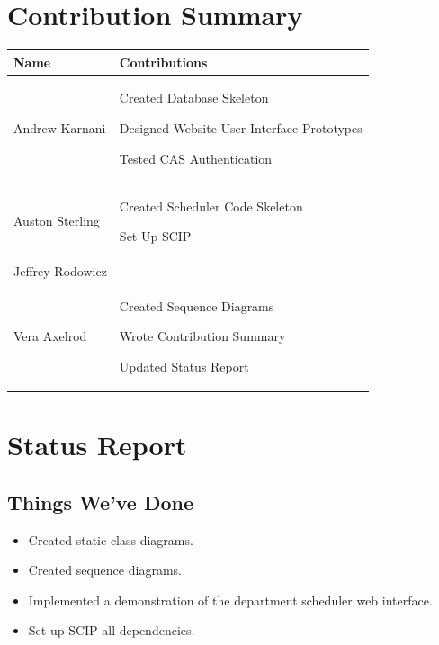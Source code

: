 \documentclass[11pt]{article}
\newenvironment{packed_itemize}{
\begin{itemize}
  \setlength{\itemsep}{1pt}
  \setlength{\parskip}{0pt}
  \setlength{\parsep}{0pt}
}{\end{itemize}}
\begin{document}
\section{Contribution Summary} %
\begin{tabular}{|m{1.4in}|m{4in}|}
\hline 
\textbf{\large Name}     & \textbf{\large Contributions} \\
\hline\hline

 Andrew Karnani
	&
	 \begin{packed_itemize}
		\item Created Database Skeleton
		\item Designed Website User Interface Prototypes
		\item Tested CAS Authentication
	\end{packed_itemize}
\\
\hline
 Auston Sterling
	&
	 \begin{packed_itemize}
	        \item Created Scheduler Code Skeleton
		  \item Set Up SCIP
	\end{packed_itemize}
\\
\hline
Jeffrey Rodowicz
	&
	 \begin{packed_itemize}
		\item 
	\end{packed_itemize}
\\
\hline
Vera Axelrod
	&
	 \begin{packed_itemize}
		\item Created Sequence Diagrams
		\item Wrote Contribution Summary
		\item Updated Status Report
	\end{packed_itemize}
\\
\hline
\end{tabular}

\section*{Status Report} %
\subsection{Things We've Done}
\begin{itemize}
	\item Created static class diagrams.
	\item Created sequence diagrams.
	\item Implemented a demonstration of the department scheduler web interface.
	\item Set up SCIP  all dependencies.
\end{itemize}
\end{document}
